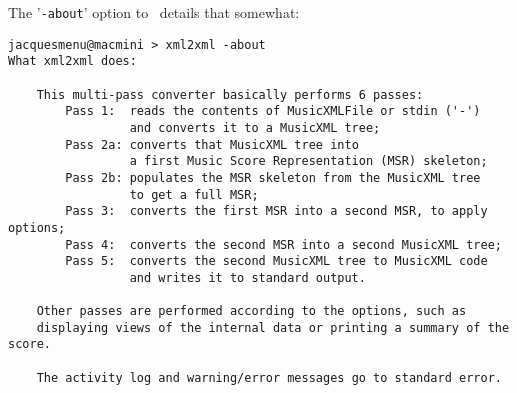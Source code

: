 The '{\tt -about}' option to \xmlToXml\ details that somewhat:
\begin{lstlisting}[language=MusicXML]
jacquesmenu@macmini > xml2xml -about
What xml2xml does:

    This multi-pass converter basically performs 6 passes:
        Pass 1:  reads the contents of MusicXMLFile or stdin ('-')
                 and converts it to a MusicXML tree;
        Pass 2a: converts that MusicXML tree into
                 a first Music Score Representation (MSR) skeleton;
        Pass 2b: populates the MSR skeleton from the MusicXML tree
                 to get a full MSR;
        Pass 3:  converts the first MSR into a second MSR, to apply options;
        Pass 4:  converts the second MSR into a second MusicXML tree;
        Pass 5:  converts the second MusicXML tree to MusicXML code
                 and writes it to standard output.

    Other passes are performed according to the options, such as
    displaying views of the internal data or printing a summary of the score.

    The activity log and warning/error messages go to standard error.
\end{lstlisting}
